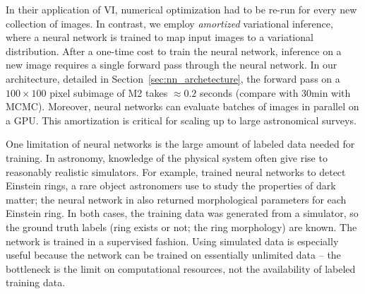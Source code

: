In their application of 
VI, numerical optimization had to be re-run for every new collection of images. 
In contrast, we employ {\itshape amortized} variational inference, where a neural network is trained to map input images to a variational distribution. After a one-time cost to train the neural network, inference 
on a new image requires a single forward pass through the neural network. In our 
architecture, detailed in Section~\ref{sec:nn_archetecture}, the forward pass on 
a $100 \times 100$ pixel subimage of M2 takes $\approx 0.2$ seconds (compare with 30min with MCMC). Moreover, neural networks can evaluate batches of images in parallel on a GPU. This amortization is critical for scaling up to large astronomical surveys.

One limitation of neural networks is the large amount of labeled data needed for training. 
In astronomy, knowledge of the physical system  often give rise to reasonably realistic simulators. 
For example, \cite{Lanusse_2017_cmudeeplens}
trained neural networks to detect Einstein rings, 
a rare object astronomers use to study 
the properties of dark matter; the neural network in \cite{Hezaveh_2017_nn_lensing_nature} also returned
morphological parameters for each Einstein ring. 
In both cases, the training data was generated from a simulator, so the ground truth labels (ring exists or not; the ring morphology) are known. The network is trained in a supervised fashion. Using simulated data is especially useful because the network can be trained on essentially unlimited data -- the bottleneck is the limit on computational resources, not the availability of labeled training data. 


